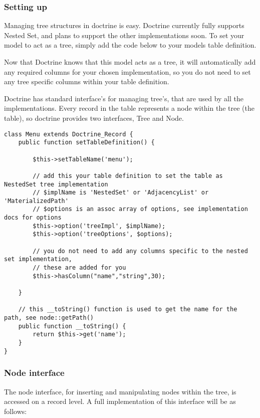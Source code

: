 \documentclass[11pt,a4paper]{report}
\begin{document}
\subsubsection{Setting up}
Managing tree structures in doctrine is easy. Doctrine currently fully supports Nested Set, and plans to support the other implementations soon. To set your model to act as a tree, simply add the code below to your models table definition.

Now that Doctrine knows that this model acts as a tree, it will automatically add any required columns for your chosen implementation, so you do not need to set any tree specific columns within your table definition.

Doctrine has standard interface's for managing tree's, that are used by all the implementations. Every record in the table represents a node within the tree (the table), so doctrine provides two interfaces, Tree and Node.

\begin{verbatim}
class Menu extends Doctrine_Record {
    public function setTableDefinition() {

        $this->setTableName('menu');

        // add this your table definition to set the table as NestedSet tree implementation
        // $implName is 'NestedSet' or 'AdjacencyList' or 'MaterializedPath'
        // $options is an assoc array of options, see implementation docs for options
        $this->option('treeImpl', $implName);
        $this->option('treeOptions', $options);

        // you do not need to add any columns specific to the nested set implementation,
        // these are added for you
        $this->hasColumn("name","string",30);

    }

    // this __toString() function is used to get the name for the path, see node::getPath()
    public function __toString() {
        return $this->get('name');
    }
}
\end{verbatim}

\subsubsection{Node interface}
The node interface, for inserting and manipulating nodes within the tree, is accessed on a record level. A full implementation of this interface will be as follows:
\end{document}
